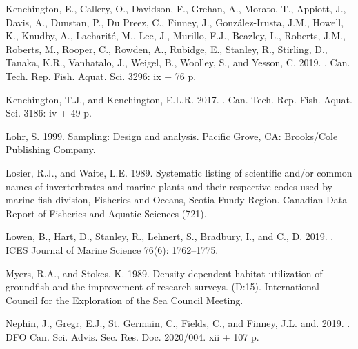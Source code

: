 \documentclass[12pt]{article}\usepackage[]{graphicx}\usepackage[]{color}
\begin{document}
\begin{CSLReferences}{1}{0}
\leavevmode\hypertarget{ref-Kenchington2019}{}%
Kenchington, E., Callery, O., Davidson, F., Grehan, A., Morato, T., Appiott, J., Davis, A., Dunstan, P., Du Preez, C., Finney, J., González-Irusta, J.M., Howell, K., Knudby, A., Lacharité, M., Lee, J., Murillo, F.J., Beazley, L., Roberts, J.M., Roberts, M., Rooper, C., Rowden, A., Rubidge, E., Stanley, R., Stirling, D., Tanaka, K.R., Vanhatalo, J., Weigel, B., Woolley, S., and Yesson, C. 2019. . Can. Tech. Rep. Fish. Aquat. Sci. 3296: ix + 76 p.

\leavevmode\hypertarget{ref-Kenchingtons2013}{}%
Kenchington, T.J., and Kenchington, E.L.R. 2017. . Can. Tech. Rep. Fish. Aquat. Sci. 3186: iv + 49 p.

\leavevmode\hypertarget{ref-Lohr1999}{}%
Lohr, S. 1999. Sampling: Design and analysis. Pacific Grove, CA: Brooks/Cole Publishing Company.

\leavevmode\hypertarget{ref-LosierWaite1989}{}%
Losier, R.J., and Waite, L.E. 1989. Systematic listing of scientific and/or common names of inverterbrates and marine plants and their respective codes used by marine fish division, {F}isheries and {O}ceans, {S}cotia-{F}undy {R}egion. Canadian Data Report of Fisheries and Aquatic Sciences (721).

\leavevmode\hypertarget{ref-Lowen:2019}{}%
Lowen, B., Hart, D., Stanley, R., Lehnert, S., Bradbury, I., and C., D. 2019. . ICES Journal of Marine Science 76(6): 1762--1775.

\leavevmode\hypertarget{ref-Myers:Stokes:1989}{}%
Myers, R.A., and Stokes, K. 1989. Density-dependent habitat utilization of groundfish and the improvement of research surveys. (D:15). International Council for the Exploration of the Sea Council Meeting.

\leavevmode\hypertarget{ref-Nephin:2019}{}%
Nephin, J., Gregr, E.J., St. Germain, C., Fields, C., and Finney, J.L. and. 2019. . DFO Can. Sci. Advis. Sec. Res. Doc. 2020/004. xii + 107 p.


\end{CSLReferences}
\end{document}
